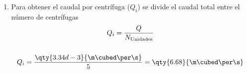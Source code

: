 {\begin{enumerate}
\begin{gather*}
            \\\\
            N_{\text{Unidades}} = \frac{\qty{164856.8608}{\m\squared}}{\qty{35000}{\m\squared}} = 4.71 \quad\longrightarrow\quad 5
            \end{gather*}
        \item Para obtener el caudal por centrífuga ($Q_{i}$) se divide el caudal total entre el número de centrífugas \begin{gather*}
            Q_{i} = \frac{Q}{N_{\text{Unidades}}}
            \\\\
            Q_{i} = \frac{\qty{3.34d-3}{\m\cubed\per\s}}{5} = \qty{6.68}{\m\cubed\per\s}
            \end{gather*}
    \end{enumerate}
}




